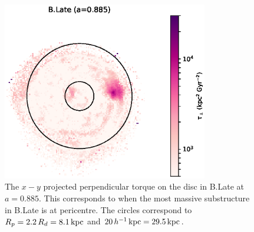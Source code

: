\begin{figure}
	\includegraphics[width=0.8\textwidth]{../figures/b_late_torque_a_0_885.eps}
	\caption{The $x-y$ projected perpendicular torque on the disc in B.Late at $a=0.885$. This corresponds to when the most massive substructure in B.Late is at pericentre. The circles correspond to $R_p = 2.2\,R_d=8.1\,\text{kpc}$ and $20\,h^{-1} \, \text{kpc}=29.5\,\text{kpc}$.}\label{fig:torque_b_late}
\end{figure}


